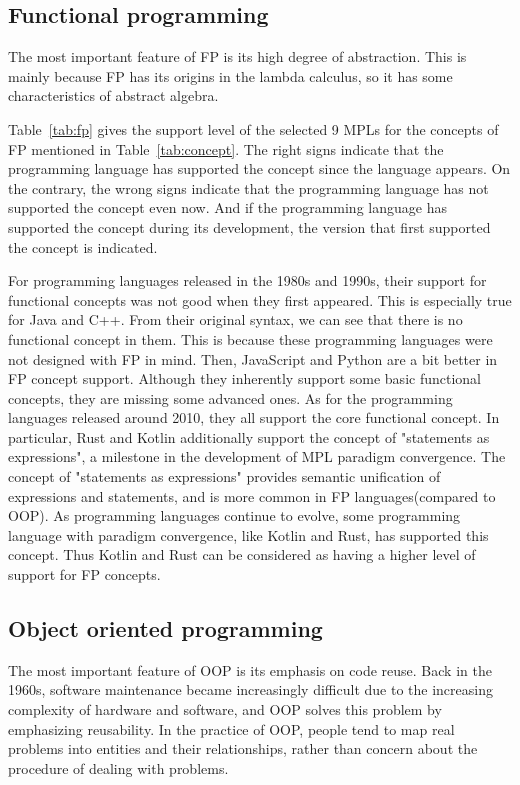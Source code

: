 \subsection{Functional programming}

The most important feature of FP is its high degree of abstraction.
This is mainly because FP has its origins in the lambda calculus,
so it has some characteristics of abstract algebra.


Table~\ref{tab:fp} gives the support level of the selected 9 MPLs for the concepts
of FP mentioned in Table~\ref{tab:concept}.
The right signs indicate that the programming language has
supported the concept since the language appears.
On the contrary, the wrong signs indicate that the programming language has
not supported the concept even now.
And if the programming language has supported the concept during its development,
the version that first supported the concept is indicated.


For programming languages released in the 1980s and 1990s,
their support for functional concepts was not good when they first appeared.
This is especially true for Java and C++.
From their original syntax, we can see that there is no functional concept in them.
This is because these programming languages were not designed with FP in mind.
Then, JavaScript and Python are a bit better in FP concept support.
Although they inherently support some basic functional concepts, they are missing some advanced ones.
As for the programming languages released around 2010, they all support the core functional concept.
In particular, Rust and Kotlin additionally support the concept of "statements as expressions",
a milestone in the development of MPL paradigm convergence.
The concept of "statements as expressions" provides semantic unification of expressions and statements,
and is more common in FP languages(compared to OOP).
As programming languages continue to evolve, some programming language with paradigm convergence,
like Kotlin and Rust, has supported this concept.
Thus Kotlin and Rust can be considered as having a higher level of support for FP concepts.

\subsection{Object oriented programming}
The most important feature of OOP is its emphasis on code reuse.
Back in the 1960s, software maintenance became increasingly difficult due to the increasing
complexity of hardware and software, and OOP solves this problem by emphasizing reusability.
In the practice of OOP, people tend to map real problems into entities and their relationships,
rather than concern about the procedure of dealing with problems.

